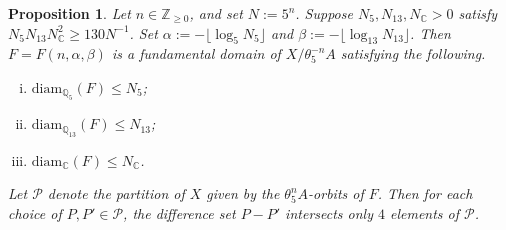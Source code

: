 \documentclass[11pt]{amsart}
\newtheorem{proposition}[lemma]{Proposition}
\theoremstyle{definition}
\begin{document}
\begin{proposition}\label{prop:constructionofpartition}
Let $n \in \mathbb{Z}_{\geq 0}$, and set $N:=5^n$.  Suppose $N_5, N_{13}, N_{\mathbb{C}}>0$ satisfy $N_5N_{13}N_{\mathbb{C}}^2 \geq 130N^{-1}$.  Set $\alpha:=-\lfloor \log_5 N_5 \rfloor$ and $\beta:=-\lfloor \log_{13} N_{13} \rfloor$.  Then $F=F(n,\alpha,\beta)$ is a fundamental domain of $X/\theta_5^{-n}A$ satisfying the following.
\begin{enumerate}[(i)]
    \item $\mathrm{diam}_{\mathbb{Q}_5}(F) \le N_5$;
    \item $\mathrm{diam}_{\mathbb{Q}_{13}}(F) \le N_{13}$;
    \item $\mathrm{diam}_{\mathbb{C}}(F) \le N_{\mathbb{C}}$.
\end{enumerate}
Let $\mathcal{P}$ denote the partition of $X$ given by the $\theta_5^nA$-orbits of $F$.  Then for each choice of $P,P' \in \mathcal{P}$, the difference set $P-P'$ intersects only $4$ elements of $\mathcal{P}$.
\end{proposition}
\end{document}
